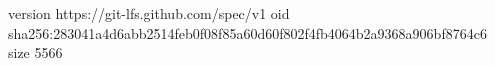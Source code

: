 version https://git-lfs.github.com/spec/v1
oid sha256:283041a4d6abb2514feb0f08f85a60d60f802f4fb4064b2a9368a906bf8764c6
size 5566
